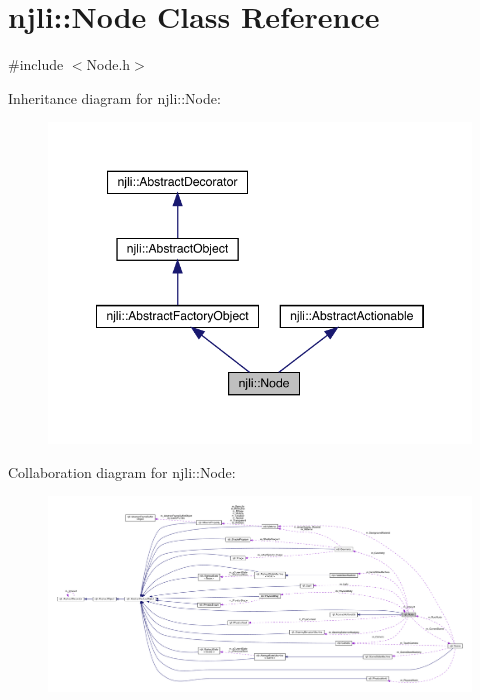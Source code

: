 \hypertarget{classnjli_1_1_node}{}\section{njli\+:\+:Node Class Reference}
\label{classnjli_1_1_node}


{\ttfamily \#include $<$Node.\+h$>$}



Inheritance diagram for njli\+:\+:Node\+:\nopagebreak
\begin{figure}[H]
\begin{center}
\leavevmode
\includegraphics[width=348pt]{classnjli_1_1_node__inherit__graph}
\end{center}
\end{figure}


Collaboration diagram for njli\+:\+:Node\+:\nopagebreak
\begin{figure}[H]
\begin{center}
\leavevmode
\includegraphics[width=350pt]{classnjli_1_1_node__coll__graph}
\end{center}
\end{figure}
